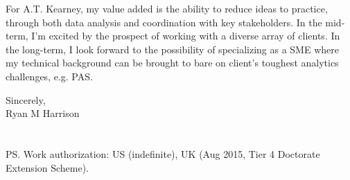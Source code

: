 \documentclass{../res}
\begin{document}
\begin{sloppypar}
\begin{resume}
For A.T. Kearney, my value added is the ability to reduce ideas to practice, through both data analysis and coordination with key stakeholders. In the mid-term, I'm excited by the prospect of working with a diverse array of clients. In the long-term, I look forward to the possibility of specializing as a SME where my technical background can be brought to bare on client's toughest analytics challenges, e.g. PAS.

\vspace{1\baselineskip}
Sincerely,
\\
Ryan M Harrison \\ \\ \\
PS. Work authorization: US (indefinite), UK (Aug 2015, Tier 4 Doctorate Extension Scheme).

\end{resume} 
\end{sloppypar}
\end{document}

